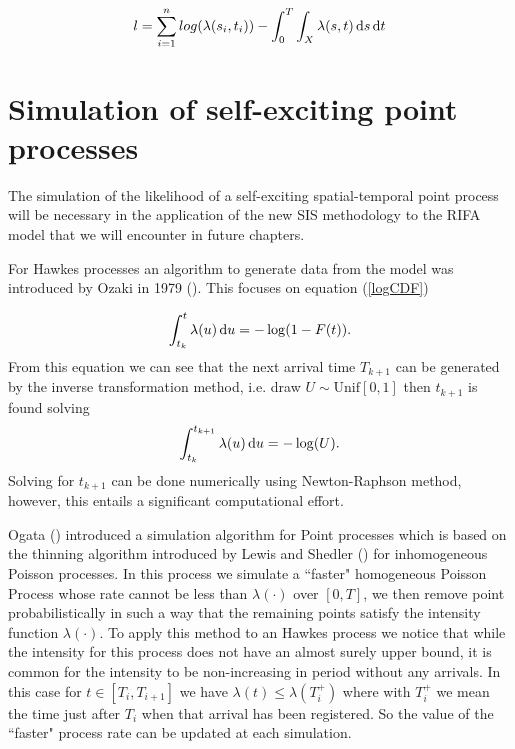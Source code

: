 \begin{equation*}
    l = \sum_{i=1}^n log(\lambda(s_i, t_i)) - \int_0^T\int_X \lambda(s,t) \operatorname{d}\!{s} \operatorname{d}\!{t}
\end{equation*}

\section{Simulation of self-exciting point processes}

The simulation of the likelihood of a self-exciting spatial-temporal point process will be necessary in the application of the new SIS methodology to the RIFA model that we will encounter in future chapters.

For Hawkes processes an algorithm to generate data from the model was introduced by Ozaki in 1979 (\cite{Ozaki}). This focuses on equation (\ref{logCDF})

\begin{equation*}
    \int_{t_k}^t \lambda (u) \operatorname{d}\!{u} = - \log(1 - F(t)).
\end{equation*}
From this equation we can see that the next arrival time $T_{k+1}$ can be generated by the inverse transformation method, i.e. draw $U \sim \text{Unif}[0, 1]$ then $t_{k+1}$ is found solving 
\begin{equation*}
    \int_{t_k}^{t_{k+1}} \lambda(u) \operatorname{d}\!{u} = - \log (U).
\end{equation*}
Solving for $t_{k+1}$ can be done numerically using Newton-Raphson method, however, this entails a significant computational effort.

Ogata (\cite{Ogata81}) introduced a simulation algorithm for Point processes which is based on the thinning algorithm introduced by Lewis and Shedler (\cite{Lewis}) for inhomogeneous Poisson processes. In this process we simulate a ``faster" homogeneous Poisson Process whose rate cannot be less than $\lambda(\cdot)$ over $[0,T]$,  we then remove point probabilistically in such a way that the remaining points satisfy the intensity function $\lambda(\cdot)$.
To apply this method to an Hawkes process we notice that while the intensity for this process does not have an almost surely upper bound, it is common for the intensity to be non-increasing in period without any arrivals. In this case for $t \in [T_i, T_{i+1}]$ we have $\lambda(t) \leq \lambda (T^+_i)$ where with $T^+_i$ we mean the time just after $T_i$ when that arrival has been registered. So the value of the ``faster" process rate can be updated at each simulation.

